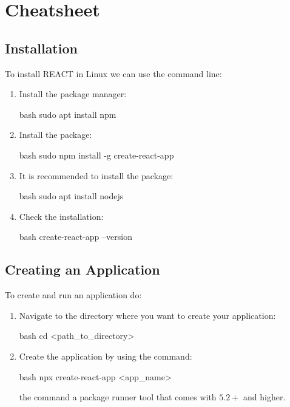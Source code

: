 \section{ Cheatsheet}

\subsection{Installation}

To install REACT in Linux we can use the command line:
\begin{enumerate}
    \item Install the  package manager:
    \begin{mintedbox}{bash}
sudo apt install npm
    \end{mintedbox}
    \item Install the  package:
    \begin{mintedbox}{bash}
sudo npm install -g create-react-app
    \end{mintedbox}
    \item It is recommended to install the  package:
    \begin{mintedbox}{bash}
sudo apt install nodejs
    \end{mintedbox}
    \item Check the installation:
    \begin{mintedbox}{bash}
create-react-app --version
    \end{mintedbox}
\end{enumerate}

\subsection{Creating an Application}

To create and run an application do:
\begin{enumerate}
    \item Navigate to the directory where you want to create your application:
    \begin{mintedbox}{bash}
cd <path_to_directory>
    \end{mintedbox}
    \item Create the application by using the
     command:
    \begin{mintedbox}{bash}
npx create-react-app <app_name>
    \end{mintedbox}
    the  command a package runner tool that comes with  $5.2+$
    and higher.
\end{enumerate}

